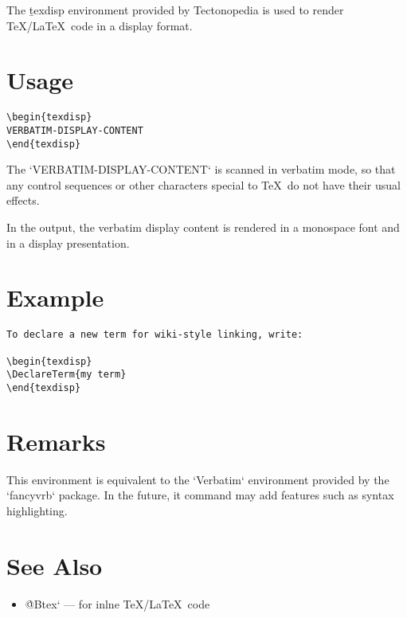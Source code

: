The \b{texdisp} environment provided by Tectonopedia is used to render
\TeX/\LaTeX\ code in a display format.

\section*{Usage}

\begin{Verbatim}
\begin{texdisp}
VERBATIM-DISPLAY-CONTENT
\end{texdisp}
\end{Verbatim}

The \tex`VERBATIM-DISPLAY-CONTENT` is scanned in verbatim mode, so that any
control sequences or other characters special to \TeX\ do not have their usual
effects.

In the output, the verbatim display content is rendered in a monospace font and
in a display presentation.

\section*{Example}

\begin{Verbatim}
To declare a new term for wiki-style linking, write:

\begin{texdisp}
\DeclareTerm{my term}
\end{texdisp}
\end{Verbatim}
    
\section*{Remarks}

This environment is equivalent to the \tex`Verbatim` environment provided by the
\tex`fancyvrb` package. In the future, it command may add features such as
syntax highlighting.

\section*{See Also}

\begin{itemize}
\item \`@Btex` — for inlne \TeX/\LaTeX\ code
\end{itemize}
